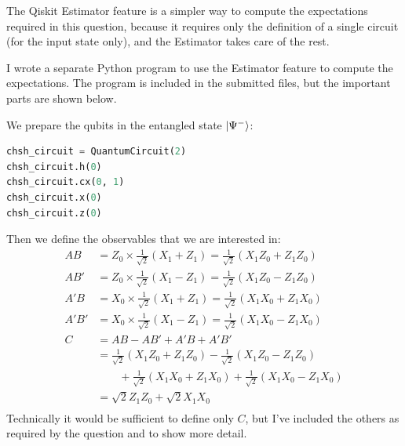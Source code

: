 \documentclass[12pt]{extarticle}
\begin{document}
\begin{enumerate}[(a)]



The Qiskit Estimator feature is a simpler way to compute the expectations required in this question,
because it requires only the definition of a single circuit (for the input state only),
and the Estimator takes care of the rest.

I wrote a separate Python program to use the Estimator feature to compute the expectations.
The program is included in the submitted files, but the important parts are shown below.

We prepare the qubits in the entangled state $\ket{\Psi^{-}}$:
\begin{lstlisting}[language=python]
chsh_circuit = QuantumCircuit(2)
chsh_circuit.h(0)
chsh_circuit.cx(0, 1)
chsh_circuit.x(0)
chsh_circuit.z(0)
\end{lstlisting}

Then we define the observables that we are interested in:
\begin{align*}
AB & = Z_0 \times \frac{1}{\sqrt{2}} (X_1 + Z_1) = \frac{1}{\sqrt{2}} (X_1 Z_0 + Z_1 Z_0) \\
AB' & = Z_0 \times \frac{1}{\sqrt{2}} (X_1 - Z_1) = \frac{1}{\sqrt{2}} (X_1 Z_0 - Z_1 Z_0) \\
A'B & = X_0 \times \frac{1}{\sqrt{2}} (X_1 + Z_1) = \frac{1}{\sqrt{2}} (X_1 X_0 + Z_1 X_0) \\
A'B' & = X_0 \times \frac{1}{\sqrt{2}} (X_1 - Z_1) = \frac{1}{\sqrt{2}} (X_1 X_0 - Z_1 X_0) \\
C & = AB - AB' + A'B + A'B' \\
& = \frac{1}{\sqrt{2}}(X_1 Z_0 + Z_1 Z_0) - \frac{1}{\sqrt{2}} (X_1 Z_0 - Z_1 Z_0) \\
& \qquad + \frac{1}{\sqrt{2}} (X_1 X_0 + Z_1 X_0) + \frac{1}{\sqrt{2}} (X_1 X_0 - Z_1 X_0) \\
& = \sqrt{2} Z_1 Z_0 + \sqrt{2} X_1 X_0 \\
\end{align*}
Technically it would be sufficient to define only $C$, but I've included the others as required by the question and to show more detail.


\end{enumerate}
\end{document}
